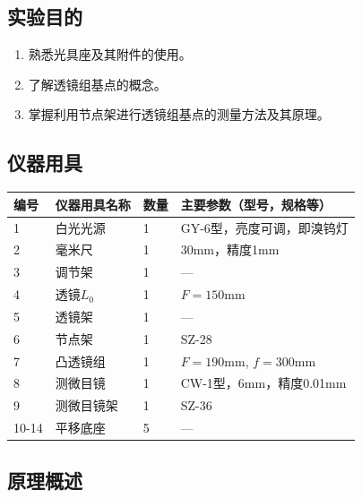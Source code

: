 \documentclass[dvipsnames, svgnames,a4paper,11pt]{article}
\begin{document}
\clearpage

\setcounter{section}{0}
	
\subsection{实验目的}
\begin{enumerate}
	\item 熟悉光具座及其附件的使用。
	\item 了解透镜组基点的概念。
	\item 掌握利用节点架进行透镜组基点的测量方法及其原理。
\end{enumerate}

\subsection{仪器用具}
\begin{table}[htbp]
	\centering
	\renewcommand\arraystretch{1.6}
	\begin{tabular}{p{}|p{}|p{}|p{}}
	\hline
	编号& 仪器用具名称 & 数量 &  主要参数（型号，规格等） \\
	\hline
	1 & 白光光源 & 1 & GY-6型，亮度可调，即溴钨灯 \\
	2 & 毫米尺 & 1 & 30mm，精度1mm \\
	3 & 调节架 & 1 & --- \\
	4 & 透镜$L_0$ & 1 & $F=150$mm \\
	5 & 透镜架 & 1 & --- \\
	6 & 节点架 & 1 & SZ-28 \\
	7 & 凸透镜组 & 1 & $F=190$mm, $f=300$mm \\
	8 & 测微目镜 & 1 & CW-1型，6mm，精度0.01mm \\
	9 & 测微目镜架 & 1 & SZ-36 \\
	10-14 & 平移底座 & 5 & --- \\
	\hline
	\end{tabular}
\end{table}

\subsection{原理概述}
\end{document}
